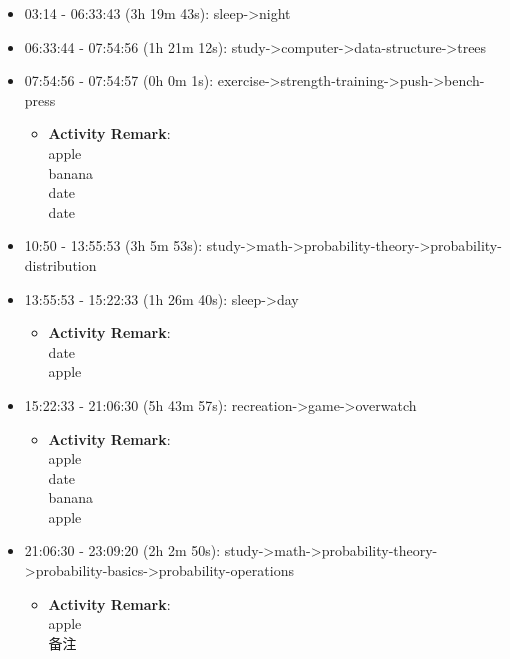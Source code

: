 \documentclass[12pt]{extarticle}
\begin{document}
\begin{itemize}[topsep=0pt, itemsep=-0.5ex]
    \item \textcolor{sleepcolor}{03:14 - 06:33:43 (3h 19m 43s): sleep->night}
    \item \textcolor{studycolor}{06:33:44 - 07:54:56 (1h 21m 12s): study->computer->data-structure->trees}
    \item \textcolor{exercisecolor}{07:54:56 - 07:54:57 (0h 0m 1s): exercise->strength-training->push->bench-press}
    \begin{itemize}[topsep=0pt, itemsep=-0.5ex]
        \item \textbf{Activity Remark}:\\
        apple\\
banana\\
date\\
date
    \end{itemize}
    \item \textcolor{studycolor}{10:50 - 13:55:53 (3h 5m 53s): study->math->probability-theory->probability-distribution}
    \item \textcolor{sleepcolor}{13:55:53 - 15:22:33 (1h 26m 40s): sleep->day}
    \begin{itemize}[topsep=0pt, itemsep=-0.5ex]
        \item \textbf{Activity Remark}:\\
        date\\
apple
    \end{itemize}
    \item \textcolor{recreationcolor}{15:22:33 - 21:06:30 (5h 43m 57s): recreation->game->overwatch}
    \begin{itemize}[topsep=0pt, itemsep=-0.5ex]
        \item \textbf{Activity Remark}:\\
        apple\\
date\\
banana\\
apple
    \end{itemize}
    \item \textcolor{studycolor}{21:06:30 - 23:09:20 (2h 2m 50s): study->math->probability-theory->probability-basics->probability-operations}
    \begin{itemize}[topsep=0pt, itemsep=-0.5ex]
        \item \textbf{Activity Remark}:\\
        apple\\
备注
    \end{itemize}

\end{itemize}
\end{document}
